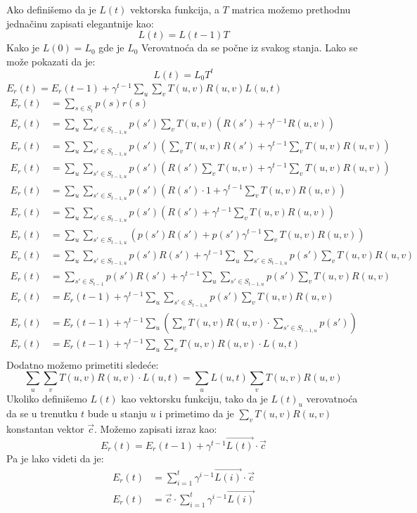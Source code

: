 \documentclass[a4paper,fleqn,12pt]{JMThesis}
\theoremstyle{plain}
\theoremstyle{definition}
\theoremstyle{definition}
\begin{document}
Ako definišemo da je $L(t)$ vektorska funkcija, a $T$ matrica možemo prethodnu jednačinu zapisati elegantnije kao:
\[ L(t) = L(t-1)T \]
Kako je $L(0) = L_0$ gde je $L_0$ Verovatnoća da se počne iz svakog stanja. Lako se može pokazati da je:
\[ L(t) = L_0T^t \]
\lem $E_r(t) = E_r(t-1) + \gamma^{t-1}\sum_{u}\sum_{v}T(u,v)R(u,v)L(u,t)$
\[
\begin{split}
	E_r(t) &= \sum_{s \in S_t}p(s)r(s)	\\
	E_r(t) &= \sum_u \sum_{s' \in S_{t-1,u}}p(s')\sum_{v}T(u,v)(R(s') + \gamma^{t-1} R(u,v))\\
	E_r(t) &= \sum_u \sum_{s' \in S_{t-1,u}}p(s')(\sum_{v}T(u,v)R(s') + \gamma^{t-1} \sum_{v}T(u,v)R(u,v))\\
	E_r(t) &= \sum_u \sum_{s' \in S_{t-1,u}}p(s')(R(s')\sum_{v}T(u,v) + \gamma^{t-1} \sum_{v}T(u,v)R(u,v))\\
	E_r(t) &= \sum_u \sum_{s' \in S_{t-1,u}}p(s')(R(s')\cdot 1 + \gamma^{t-1} \sum_{v}T(u,v)R(u,v))\\
	E_r(t) &= \sum_u \sum_{s' \in S_{t-1,u}}p(s')(R(s') + \gamma^{t-1} \sum_{v}T(u,v)R(u,v))\\
	E_r(t) &= \sum_u \sum_{s' \in S_{t-1,u}}\left(p(s')R(s') + p(s')\gamma^{t-1}\sum_{v}T(u,v)R(u,v)\right)\\
	E_r(t) &= \sum_u \sum_{s' \in S_{t-1,u}}p(s')R(s') + \gamma^{t-1}\sum_u \sum_{s' \in S_{t-1,u}}p(s')\sum_{v}T(u,v)R(u,v)\\
	E_r(t) &= \sum_{s' \in S_{t-1}}p(s')R(s') + \gamma^{t-1}\sum_u \sum_{s' \in S_{t-1,u}}p(s')\sum_{v}T(u,v)R(u,v)\\
	E_r(t) &= E_r(t-1) + \gamma^{t-1}\sum_u \sum_{s' \in S_{t-1,u}}p(s')\sum_{v}T(u,v)R(u,v)\\
	E_r(t) &= E_r(t-1) + \gamma^{t-1}\sum_u \left(\sum_{v}T(u,v)R(u,v) \cdot \sum_{s' \in S_{t-1,u}}p(s')\right)\\
	E_r(t) &= E_r(t-1) + \gamma^{t-1}\sum_u \sum_{v}T(u,v)R(u,v) \cdot L(u,t)\\
\end{split}
\]
Dodatno možemo primetiti sledeće:
\[
	\sum_u \sum_{v}T(u,v)R(u,v) \cdot L(u,t) = \sum_u L(u,t)\sum_{v}T(u,v)R(u,v)
\]
Ukoliko definišemo $L(t)$ kao vektorsku funkciju, tako da je $L(t)_u$ verovatnoća da se u trenutku $t$ bude u stanju $u$ i primetimo da je $\sum_{v}T(u,v)R(u,v)$ konstantan vektor $\vec{c}$.
Možemo zapisati izraz kao:
\[
	E_r(t) = E_r(t-1) + \gamma^{t-1}\vec{L(t)} \cdot \vec{c}
\]  
Pa je lako videti da je:
\[
	\begin{split}
	E_r(t) &= \sum_{i=1}^{t}\gamma^{i-1}\vec{L(i)} \cdot \vec{c}\\
	E_r(t) &= \vec{c} \cdot \sum_{i=1}^{t}\gamma^{i-1}\vec{L(i)}
	\end{split}
\]
\end{document}
